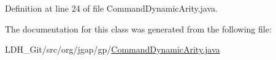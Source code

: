 Definition at line 24 of file Command\-Dynamic\-Arity.\-java.



The documentation for this class was generated from the following file\-:\begin{DoxyCompactItemize}
\item 
L\-D\-H\-\_\-\-Git/src/org/jgap/gp/\hyperlink{_command_dynamic_arity_8java}{Command\-Dynamic\-Arity.\-java}\end{DoxyCompactItemize}
